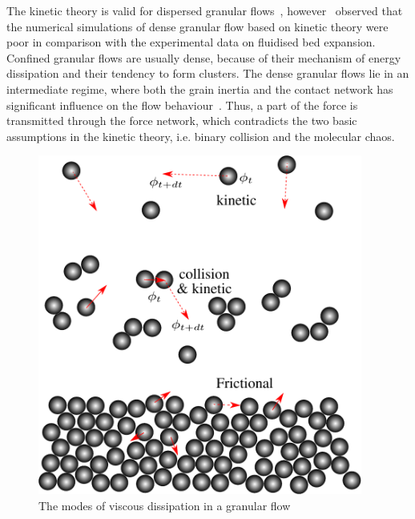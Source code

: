 The kinetic theory is valid for dispersed granular flows~\citep{Ng2008}, 
however~\citet{VanWachem2001} observed that the numerical simulations of dense 
granular flow based on kinetic theory were poor in comparison with the 
experimental data on fluidised bed expansion. Confined granular flows are 
usually dense, because of their mechanism of energy dissipation and their 
tendency to form clusters. The dense granular flows lie in an intermediate 
regime, where both the grain inertia and the contact network has significant 
influence on the flow behaviour~\citep{Pouliquen2002}. Thus, a part of the 
force is transmitted through the force network, which contradicts the two basic 
assumptions in the kinetic theory, i.e. binary collision and the molecular 
chaos. 
%
\begin{figure}[htbp]
\centering
\includegraphics[width=0.95\textwidth]{kinetic}
\caption{The modes of viscous dissipation in a granular flow}
\label{fig:kinetic}
\end{figure}
%


